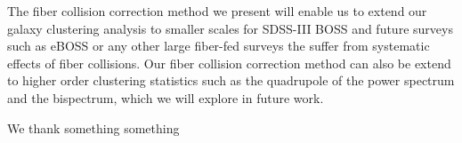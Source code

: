 \documentclass{emulateapj}
\begin{document}
The fiber collision correction method we present will enable us to extend our galaxy clustering analysis to smaller scales for SDSS-III BOSS and future surveys such as eBOSS or any other large fiber-fed surveys the suffer from systematic effects of fiber collisions. Our fiber collision correction method can also be extend to higher order clustering statistics such as the quadrupole of the power spectrum and the bispectrum, which we will explore in future work. 

\bigskip
We thank something something



\end{document}
